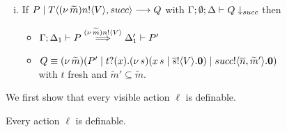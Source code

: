 \begin{definition}[Definability]
\begin{enumerate}
\begin{enumerate}[i.]
				\item	If $P \;|\; T\langle (\nu\, \widetilde{m})n ! \langle V \rangle, succ \rangle \longrightarrow Q$
						with $\Gamma; \emptyset; \Delta \vdash Q \downarrow_{succ}$ then 
						\begin{itemize}
							\item $\Gamma; \Delta_1 \vdash P \stackrel{(\nu\, \widetilde{m})n ! \langle V \rangle}{\Longrightarrow} \Delta_1' \vdash P'$
						\item $Q \equiv (\nu\, \widetilde{m})(P' \;|\; t ? (x) . (\nu\, s)(x\, {s} \;|\; \overline{s} ! \langle V \rangle . \mathbf{0}) \;|\; succ ! \langle \overline{n}, \widetilde{m}' \rangle . \mathbf{0})$ \\
						with $t$ fresh and $\widetilde{m}' \subseteq \widetilde{m}$.
						\end{itemize}
			\end{enumerate}
	\end{enumerate}	
%
\end{definition}

We first show that every visible action $\ell$ is definable.

\begin{lemma}[Definability]
	\label{lem:definibility}
	Every action $\ell$ is definable.
\end{lemma}

